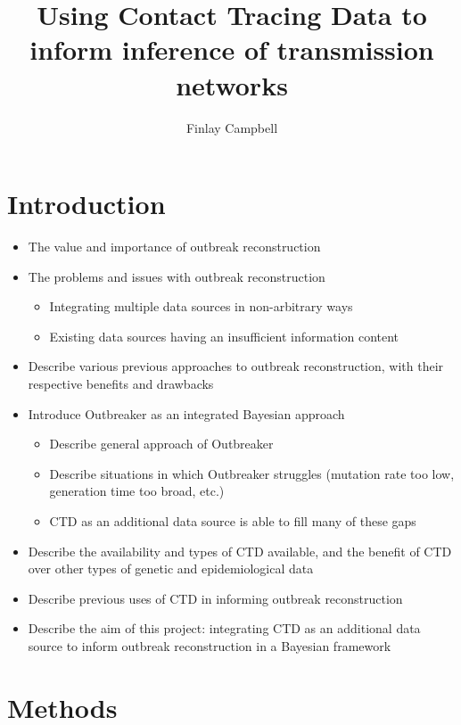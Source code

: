 \documentclass{article}
\begin{document}
\title{Using Contact Tracing Data to inform inference of transmission networks}
\author{Finlay Campbell}

\maketitle

\section{Introduction}
	\begin{itemize}
		\item The value and importance of outbreak reconstruction
		\item The problems and issues with outbreak reconstruction
		\begin{itemize}
			\item Integrating multiple data sources in non-arbitrary ways
			\item Existing data sources having an insufficient information content
		\end{itemize}
		\item Describe various previous approaches to outbreak reconstruction, with their respective benefits and drawbacks
		\item Introduce Outbreaker as an integrated Bayesian approach
		\begin{itemize}
				\item Describe general approach of Outbreaker
				\item Describe situations in which Outbreaker struggles (mutation rate too low, generation time too broad, etc.)
				\item CTD as an additional data source is able to fill many of these gaps 
		\end{itemize}	
		\item Describe the availability and types of CTD available, and the benefit of CTD over other types of genetic and epidemiological data
		\item Describe previous uses of CTD in informing outbreak reconstruction
		\item Describe the aim of this project: integrating CTD as an additional data source to inform outbreak reconstruction in a Bayesian framework
	\end{itemize}

\section{Methods}
\end{document}
